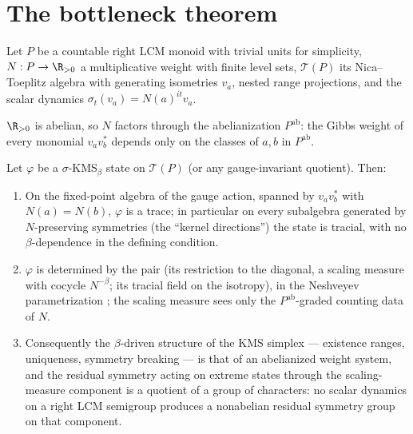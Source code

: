 \section{The bottleneck theorem}\label{XXXIV:sec:bottleneck}

Let $P$ be a countable right LCM monoid with trivial units for simplicity, $N:P\to
\R_{>0}$ a multiplicative weight with finite level sets, $\mathcal T(P)$ its Nica--Toeplitz
algebra with generating isometries $v_a$, nested range projections, and the scalar
dynamics $\sigma_t(v_a)=N(a)^{it}v_a$.

\begin{lemma}\label{XXXIV:lem:ab}
$\R_{>0}$ is abelian, so $N$ factors through the abelianization $P^{\mathrm{ab}}$: the Gibbs
weight of every monomial $v_av_b^*$ depends only on the classes of $a,b$ in $P^{\mathrm{ab}}$.
\end{lemma}

\begin{theorem}\label{XXXIV:thm:bottleneck}
Let $\varphi$ be a $\sigma$-KMS$_\beta$ state on $\mathcal T(P)$ (or any gauge-invariant
quotient). Then:
\begin{enumerate}
\item On the fixed-point algebra of the gauge action, spanned by $v_av_b^*$ with
$N(a)=N(b)$, $\varphi$ is a trace; in particular on every subalgebra generated by
$N$-preserving symmetries (the ``kernel directions'') the state is tracial, with no
$\beta$-dependence in the defining condition.
\item $\varphi$ is determined by the pair (its restriction to the diagonal, a scaling
measure with cocycle $N^{-\beta}$; its tracial field on the isotropy), in the
Neshveyev parametrization \cite{Nesh13}; the scaling measure sees only the
$P^{\mathrm{ab}}$-graded counting data of $N$.
\item Consequently the $\beta$-driven structure of the KMS simplex --- existence ranges,
uniqueness, symmetry breaking --- is that of an abelianized weight system, and the
residual symmetry acting on extreme states through the scaling-measure component is a
quotient of a group of characters: no scalar dynamics on a right LCM semigroup produces
a nonabelian residual symmetry group on that component.
\end{enumerate}
\end{theorem}

